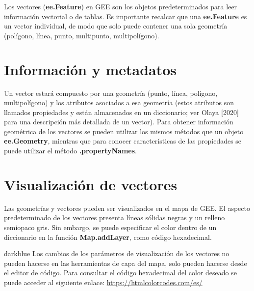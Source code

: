 \documentclass[
  12pt,
  letterpaper,
  twoside]{book}
\newcommand\boldpurple[1]{\textcolor{darkpurple}{\textbf{#1}}}
\begin{document}
Los vectores (\boldpurple{ee.Feature}) en GEE son los objetos predeterminados para leer información vectorial o de tablas.
Es importante recalcar que una \boldpurple{ee.Feature} es un vector individual, de modo que solo puede contener una sola geometría (polígono, línea, punto, multipunto, multipolígono).

\hypertarget{informaciuxf3n-y-metadatos-1}{%
\section{Información y metadatos}\label{informaciuxf3n-y-metadatos-1}}

Un vector estará compuesto por una geometría (punto, línea, polígono, multipolígono) y los atributos asociados a esa geometría (estos atributos son llamados propiedades y están almacenados en un diccionario; ver Olaya {[}2020{]} para una descripción más detallada de un vector). Para obtener información geométrica de los vectores se pueden utilizar los mismos métodos que un objeto \boldpurple{ee.Geometry}, mientras que para conocer características de las propiedades se puede utilizar el método \boldpurple{.propertyNames}.

\hypertarget{visualizaciuxf3n-de-vectores}{%
\section{Visualización de vectores}\label{visualizaciuxf3n-de-vectores}}

Las geometrías y vectores pueden ser visualizados en el mapa de GEE. El aspecto predeterminado de los vectores presenta líneas sólidas negras y un relleno semiopaco gris. Sin embargo, se puede especificar el color dentro de un diccionario en la función \boldpurple{Map.addLayer}, como código hexadecimal.

\begin{bluebox2}

\begin{awesomeblock}{5pt}{\faLightbulb}{darkblue}
Los cambios de los parámetros de visualización de los vectores no pueden hacerse en las herramientas de capa del mapa, solo pueden hacerse desde el editor de código. Para consultar el código hexadecimal del color deseado se puede acceder al siguiente enlace: \url{https://htmlcolorcodes.com/es/}

\end{awesomeblock}

\end{bluebox2}
\end{document}
